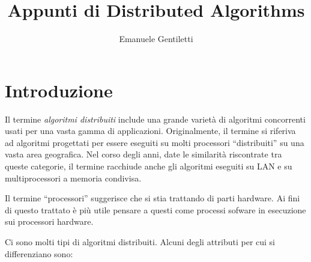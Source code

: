 \documentclass[italian,]{book}
\title{Appunti di Distributed Algorithms}
\author{Emanuele Gentiletti}
\date{}
\begin{document}
\maketitle

\newcommand{\outnbrs}{out\text{-}nbrs} 
\newcommand{\innbrs}{in\text{-}nbrs}
\newcommand{\indist}[1]{\overset{#1}{\sim}}
\newtheorem{theorem}{Teorema}[chapter]

{
\setcounter{tocdepth}{2}
\tableofcontents
}
\hypertarget{introduzione}{%
\chapter{Introduzione}\label{introduzione}}

Il termine \emph{algoritmi distribuiti} include una grande varietà di
algoritmi concorrenti usati per una vasta gamma di applicazioni.
Originalmente, il termine si riferiva ad algoritmi progettati per essere
eseguiti su molti processori ``distribuiti'' su una vasta area
geografica. Nel corso degli anni, date le similarità riscontrate tra
queste categorie, il termine racchiude anche gli algoritmi eseguiti su
LAN e su multiprocessori a memoria condivisa.

Il termine ``processori'' suggerisce che si stia trattando di parti
hardware. Ai fini di questo trattato è più utile pensare a questi come
processi sofware in esecuzione sui processori hardware.

Ci sono molti tipi di algoritmi distribuiti. Alcuni degli attributi per
cui si differenziano sono:
\end{document}
